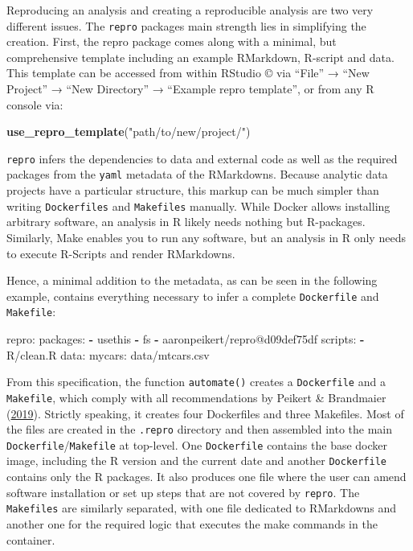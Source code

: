 \documentclass[12pt,a4paper,twoside]{article}
\newenvironment{Shaded}{\begin{snugshade}}{\end{snugshade}}
\newcommand{\AttributeTok}[1]{\textcolor[rgb]{0.77,0.63,0.00}{#1}}
\newcommand{\FunctionTok}[1]{\textcolor[rgb]{0.00,0.00,0.00}{#1}}
\newcommand{\KeywordTok}[1]{\textcolor[rgb]{0.13,0.29,0.53}{\textbf{#1}}}
\newcommand{\NormalTok}[1]{#1}
\newcommand{\StringTok}[1]{\textcolor[rgb]{0.31,0.60,0.02}{#1}}
\begin{document}
Reproducing an analysis and creating a reproducible analysis are two very different issues.
The \texttt{repro} packages main strength lies in simplifying the creation.
First, the repro package comes along with a minimal, but comprehensive template including an example RMarkdown, R-script and data.
This template can be accessed from within RStudio © via ``File'' → ``New Project'' → ``New Directory'' → ``Example repro template'', or from any R console via:

\begin{Shaded}
\begin{Highlighting}[]
\KeywordTok{use_repro_template}\NormalTok{(}\StringTok{"path/to/new/project/"}\NormalTok{)}
\end{Highlighting}
\end{Shaded}

\texttt{repro} infers the dependencies to data and external code as well as the required packages from the \texttt{yaml} metadata of the RMarkdowns.
Because analytic data projects have a particular structure, this markup can be much simpler than writing \texttt{Dockerfiles} and \texttt{Makefiles} manually.
While Docker allows installing arbitrary software, an analysis in R likely needs nothing but R-packages. Similarly, Make enables you to run any software, but an analysis in R only needs to execute R-Scripts and render RMarkdowns.

Hence, a minimal addition to the metadata, as can be seen in the following example, contains everything necessary to infer a complete \texttt{Dockerfile} and \texttt{Makefile}:

\begin{Shaded}
\begin{Highlighting}[]
\FunctionTok{repro:}
  \FunctionTok{packages:}
    \KeywordTok{-}\NormalTok{ usethis}
    \KeywordTok{-}\NormalTok{ fs}
    \KeywordTok{-}\NormalTok{ aaronpeikert/repro@d09def75df}
  \FunctionTok{scripts:}
    \KeywordTok{-}\NormalTok{ R/clean.R}
  \FunctionTok{data:}
    \FunctionTok{mycars:}\AttributeTok{ data/mtcars.csv}
\end{Highlighting}
\end{Shaded}

From this specification, the function \texttt{automate()} creates a \texttt{Dockerfile} and a \texttt{Makefile}, which comply with all recommendations by Peikert \& Brandmaier (\protect\hyperlink{ref-peikertReproducibleDataAnalysis2019}{2019}).
Strictly speaking, it creates four Dockerfiles and three Makefiles.
Most of the files are created in the \texttt{.repro} directory and then assembled into the main \texttt{Dockerfile}/\texttt{Makefile} at top-level.
One \texttt{Dockerfile} contains the base docker image, including the R version and the current date and another \texttt{Dockerfile} contains only the R packages.
It also produces one file where the user can amend software installation or set up steps that are not covered by \texttt{repro}.
The \texttt{Makefiles} are similarly separated, with one file dedicated to RMarkdowns and another one for the required logic that executes the make commands in the container.
\end{document}
